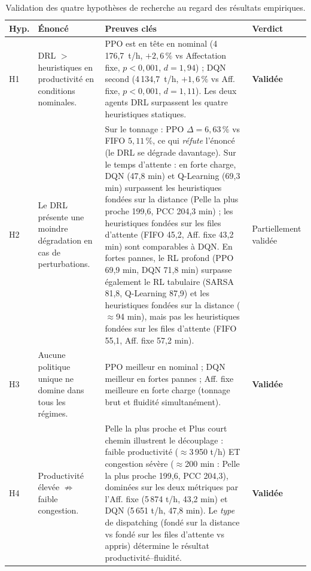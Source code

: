 \documentclass[11pt,a4paper]{article}
\begin{document}
\begin{table}[H]
\caption{Validation des quatre hypothèses de recherche au regard des résultats empiriques.}
\label{tab:hypotheses}
\footnotesize\setlength{\tabcolsep}{4pt}
\begin{tabularx}{\textwidth}{@{}lXXl@{}}
\toprule
\textbf{Hyp.} & \textbf{Énoncé} & \textbf{Preuves clés} & \textbf{Verdict} \\
\midrule
H1 & DRL $>$ heuristiques en productivité en conditions nominales. & PPO est en tête en nominal (4\,176,7~t/h, $+2{,}6\,\%$ vs Affectation fixe, $p<0{,}001$, $d=1{,}94$) ; DQN second (4\,134,7~t/h, $+1{,}6\,\%$ vs Aff. fixe, $p<0{,}001$, $d=1{,}11$). Les deux agents DRL surpassent les quatre heuristiques statiques. & \textbf{Validée} \\[4pt]
H2 & Le DRL présente une moindre dégradation en cas de perturbations. & Sur le tonnage : PPO $\Delta{=}6{,}63\,\%$ vs FIFO $5{,}11\,\%$, ce qui \textit{réfute} l'énoncé (le DRL se dégrade davantage). Sur le temps d'attente : en forte charge, DQN (47,8 min) et Q-Learning (69,3 min) surpassent les heuristiques fondées sur la distance (Pelle la plus proche 199,6, PCC 204,3 min) ; les heuristiques fondées sur les files d'attente (FIFO 45,2, Aff. fixe 43,2 min) sont comparables à DQN. En fortes pannes, le RL profond (PPO 69,9 min, DQN 71,8 min) surpasse également le RL tabulaire (SARSA 81,8, Q-Learning 87,9) et les heuristiques fondées sur la distance ($\approx$94 min), mais pas les heuristiques fondées sur les files d'attente (FIFO 55,1, Aff. fixe 57,2 min). & Partiellement validée \\[4pt]
H3 & Aucune politique unique ne domine dans tous les régimes. & PPO meilleur en nominal ; DQN meilleur en fortes pannes ; Aff. fixe meilleure en forte charge (tonnage brut et fluidité simultanément). & \textbf{Validée} \\[4pt]
H4 & Productivité élevée $\not\Rightarrow$ faible congestion. & Pelle la plus proche et Plus court chemin illustrent le découplage : faible productivité ($\approx$3\,950 t/h) ET congestion sévère ($\approx$200 min : Pelle la plus proche 199,6, PCC 204,3), dominées sur les deux métriques par l'Aff. fixe (5\,874 t/h, 43,2 min) et DQN (5\,651 t/h, 47,8 min). Le \emph{type} de dispatching (fondé sur la distance vs fondé sur les files d'attente vs appris) détermine le résultat productivité--fluidité. & \textbf{Validée} \\
\bottomrule
\end{tabularx}
\end{table}
\end{document}
